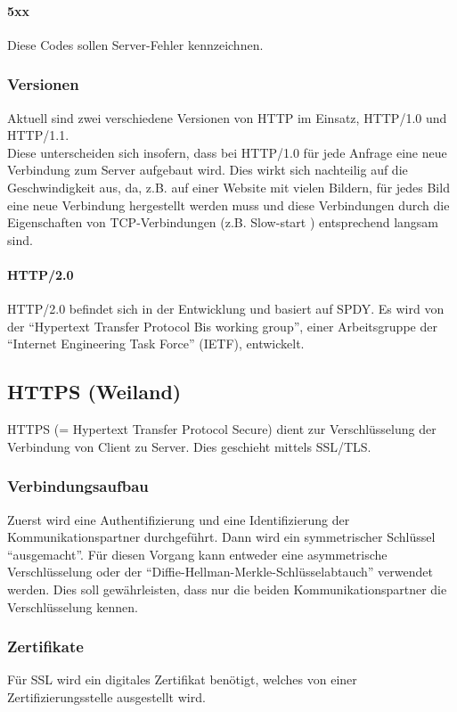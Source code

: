 \paragraph{5xx}
Diese Codes sollen Server-Fehler kennzeichnen.

\subsubsection{Versionen}
Aktuell sind zwei verschiedene Versionen von HTTP im Einsatz, HTTP/1.0 und HTTP/1.1.
\\
Diese unterscheiden sich insofern, dass bei HTTP/1.0 für jede Anfrage eine neue Verbindung zum Server aufgebaut wird. Dies wirkt sich nachteilig auf die Geschwindigkeit aus, da, z.B. auf einer Website mit vielen Bildern, für jedes Bild eine neue Verbindung hergestellt werden muss und diese Verbindungen durch die Eigenschaften von TCP-Verbindungen (z.B. Slow-start ) entsprechend langsam sind.

\paragraph{HTTP/2.0}  HTTP/2.0 befindet sich in der Entwicklung und basiert auf SPDY. Es wird von der \enquote{Hypertext Transfer Protocol Bis working group}, einer Arbeitsgruppe der \enquote{Internet Engineering Task Force} (IETF), entwickelt.

\subsection{HTTPS (Weiland)}
HTTPS (= Hypertext Transfer Protocol Secure) dient zur Verschlüsselung der Verbindung von Client zu Server. Dies geschieht mittels SSL/TLS.
\subsubsection{Verbindungsaufbau}
Zuerst wird eine Authentifizierung und eine Identifizierung der Kommunikationspartner durchgeführt. Dann wird ein symmetrischer Schlüssel \enquote{ausgemacht}. Für diesen Vorgang kann entweder eine asymmetrische Verschlüsselung oder der \enquote{Diffie-Hellman-Merkle-Schlüsselabtauch} verwendet werden. Dies soll gewährleisten, dass nur die beiden Kommunikationspartner die Verschlüsselung kennen.
\subsubsection{Zertifikate}
Für SSL wird ein digitales Zertifikat benötigt, welches von einer Zertifizierungsstelle ausgestellt wird.
